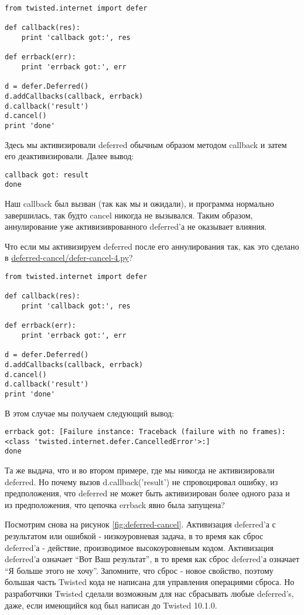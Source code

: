  \begin{verbatim}
from twisted.internet import defer

def callback(res):
    print 'callback got:', res

def errback(err):
    print 'errback got:', err

d = defer.Deferred()
d.addCallbacks(callback, errback)
d.callback('result')
d.cancel()
print 'done'
\end{verbatim} 


Здесь мы активизировали deferred обычным образом 
методом callback и затем его деактивизировали. Далее вывод:

 \begin{verbatim}
callback got: result
done
\end{verbatim} 


Наш callback был вызван (так как мы и ожидали), и 
программа нормально завершилась, так будто cancel  
никогда не вызывался. Таким образом, аннулирование уже 
активизиврованного deferred'а не оказывает влияния.


Что если мы активизируем deferred после его 
аннулирования так, как это сделано в 
\href{http://github.com/jdavisp3/twisted-intro/blob/master/deferred-cancel/defer-cancel-4.py#L1}{deferred-cancel/defer-cancel-4.py}?


 \begin{verbatim}
from twisted.internet import defer

def callback(res):
    print 'callback got:', res

def errback(err):
    print 'errback got:', err

d = defer.Deferred()
d.addCallbacks(callback, errback)
d.cancel()
d.callback('result')
print 'done'
\end{verbatim} 

В этом случае мы получаем следующий вывод:

 \begin{verbatim}
errback got: [Failure instance: Traceback (failure with no frames): 
<class 'twisted.internet.defer.CancelledError'>:]
done
\end{verbatim} 


Та же выдача, что и во втором примере, где мы никогда не 
активизировали deferred. Но почему вызов d.callback('result') 
не спровоцировал ошибку, из предположения, что deferred не может 
быть активизирован более одного раза и из предположения, что 
цепочка errback явно была запущена?


Посмотрим снова на рисунок \ref{fig:deferred-cancel}. Активизация 
deferred'а с результатом или ошибкой -  низкоуровневая задача, 
в то время как сброс deferred'а - действие, производимое 
высокоуровневым кодом. Активизация deferred'а означает ``Вот Ваш результат'', 
в то время как сброс deferred'а означает ``Я больше этого не хочу''. 
Запомните, что сброс - новое свойство, поэтому большая часть Twisted 
кода не написана для управления операциями сброса. Но разработчики 
Twisted сделали возможным для нас сбрасывать любые deferred's, 
даже, если имеющийся код был написан до Twisted 10.1.0.


